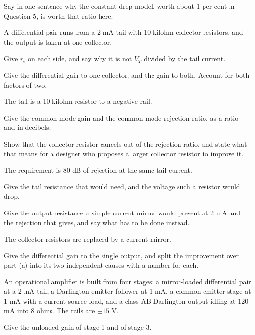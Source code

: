 Say in one sentence why the constant-drop model, worth about 1 per cent in Question 5, is worth that ratio here.

\label{exa:q:9}

A differential pair runs from a 2 mA tail with 10 kilohm collector resistors, and the output is taken at one collector.

 Give $r_e$ on each side, and say why it is not $V_T$ divided by the tail current.

Give the differential gain to one collector, and the gain to both. Account for both factors of two.

 The tail is a 10 kilohm resistor to a negative rail.

Give the common-mode gain and the common-mode rejection ratio, as a ratio and in decibels.

Show that the collector resistor cancels out of the rejection ratio, and state what that means for a designer who proposes a larger collector resistor to improve it.

 The requirement is 80 dB of rejection at the same tail current.

Give the tail resistance that would need, and the voltage such a resistor would drop.

Give the output resistance a simple current mirror would present at 2 mA and the rejection that gives, and say what has to be done instead.

 The collector resistors are replaced by a current mirror.

Give the differential gain to the single output, and split the improvement over part (a) into its two independent causes with a number for each.

\label{exa:q:10}

An operational amplifier is built from four stages: a mirror-loaded differential pair at a 2 mA tail, a Darlington emitter follower at 1 mA, a common-emitter stage at 1 mA with a current-source load, and a class-AB Darlington output idling at 120 mA into 8 ohms. The rails are $\pm 15$ V.

 Give the unloaded gain of stage 1 and of stage 3.

